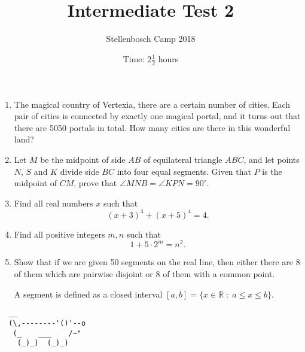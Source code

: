 \documentclass{article}
\title{Intermediate Test 2}
\author{Stellenbosch Camp 2018}
\date{Time: $2\frac{1}{2}$ hours}
\begin{document}
\maketitle

\begin{enumerate}[1.]

\item %
The magical country of Vertexia, there are a certain number of cities. Each pair of cities is connected by exactly one magical portal, and it turns out that there are 5050 portals in total. How many cities are there in this wonderful land?

\vspace{12pt}
\item 
Let $M$ be the midpoint of side $AB$ of equilateral triangle $ABC$, and let points $N$, $S$ and $K$ divide side $BC$ into four equal segments. Given that $P$ is the midpoint of $CM$, prove that $\angle MNB = \angle KPN = 90^\circ$.

\vspace{12pt}
\item %
Find all real numbers $x$ such that \[ (x+3)^4 + (x+5)^4 = 4. \]

\vspace{12pt}
\item %
Find all positive integers $m, n$ such that \[ 1 + 5 \cdot 2^m = n^2. \]

\vspace{12pt}
\item %
Show that if we are given 50 segments on the real line, then either there are 8 of them which are pairwise disjoint or 8 of them with a common point. 

A segment is defined as a closed interval $[a, b] = \{x \in \mathbb{R} \;:\; a \leq x \leq b \}$.

\end{enumerate}


\vspace{12pt}
\begin{center}
\begin{BVerbatim}
  __
  (\,--------'()'--o
   (_    ___    /~"
    (_)_)  (_)_)
\end{BVerbatim}
\end{center}
\end{document}
